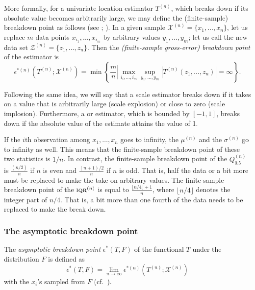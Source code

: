 More formally, for a univariate location estimator $T^{(n)}$, which breaks down
if its absolute value becomes arbitrarily large, we may define the (finite-sample)
breakdown point as follows (see \citealp{hampel:stahel:1982};
\citealp{donoho:huber:1983}). In a given sample $\mathcal{X}^{(n)} = \{x_1,
\dots, x_n\}$, let us replace $m$ data points $x_{i_1}, \dots, x_{i_{m}}$
by arbitrary values $y_1, \dots, y_{m}$; let us call the new data set       
$\mathcal{Z}^{(n)} = \{z_1, \dots, z_n\}$. Then the \emph{(finite-sample
gross-error) breakdown point} of the estimator is
\[
    \epsilon^{*(n)}(T^{(n)}; \mathcal{X}^{(n)}) 
    = \min \left\{\left. \frac{m}{n}\right| \max_{i_i, \dots, i_{m}} \sup_{y_1, \dots, y_{m}} 
      \left|T^{(n)}(z_1, \dots, z_n)\right| =\infty \right\}.
\]

Following the same idea, we will say that a scale estimator breaks down if it
takes on a value that is arbitrarily large (scale explosion) or close to zero
(scale implosion). Furthermore, a  or 
estimator, which is bounded by $[-1, 1]$, breaks down if the absolute value of
the estimate attains the value of 1.

\begin{stexample}
If the $i$th observation among $x_1, \dots, x_n$ goes to infinity, the 
$\mu^{(n)}$ and the  $\sigma^{(n)}$ go to infinity as well. This
means that the finite-sample breakdown point of these two statistics is $1/n$.
In contrast, the finite-sample breakdown point of the  $Q_{0.5}^{(n)}$ is
$\frac{(n/2)}{n}$ if $n$ is even and $\frac{(n+1)/2}{n}$ if $n$ is odd. That is,
half the data or a bit more must be replaced to make the  take on arbitrary
values. The finite-sample breakdown point of the 
$\stsc{IQR}^{(n)}$ is equal to $\frac{\lfloor n/4 \rfloor + 1}{n}$, where
$\lfloor n/4 \rfloor $ denotes the integer part of $n/4$. That is, a bit more than 
one fourth of the data needs to be replaced to make the  break down.
\end{stexample}



\subsubsection{The asymptotic breakdown point}

The \emph{asymptotic breakdown point} $\epsilon^*(T, F)$ of the functional
$T$ under the distribution $F$ is defined as
\[
    \epsilon^*(T, F) = \lim_{n\rightarrow\infty} \epsilon^{*(n)}(T^{(n)}; \mathcal{X}^{(n)})
\]
with the $x_i$'s sampled from $F$ (cf.\ \citealp{hampel:1971}).

